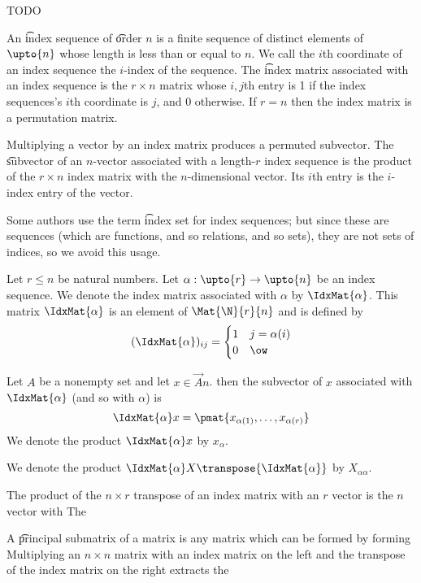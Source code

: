 

TODO


An \t{index sequence} of \t{order} $n$ is a finite sequence of distinct elements of $\upto{n}$ whose length is less than or equal to $n$.
We call the $i$th coordinate of an index sequence the \t{$i$-index} of the sequence.
The \t{index matrix} associated with an index sequence is the $r \times n$ matrix whose $i,j$th entry is 1 if the index sequences's $i$th coordinate is $j$, and $0$ otherwise.
If $r = n$ then the index matrix is a permutation matrix.

Multiplying a vector by an index matrix produces a permuted subvector.
The \t{subvector} of an $n$-vector {associated with} a length-$r$ index sequence is the product of the $r \times n$ index matrix with the $n$-dimensional vector.
Its $i$th entry is the $i$-index entry of the vector.

Some authors use the term \t{index set} for index sequences; but since these are sequences (which are functions, and so relations, and so sets), they are not sets of indices, so we avoid this usage.


Let $r \leq n$ be natural numbers.
Let $\alpha: \upto{r} \to \upto{n}$ be an index sequence.
We denote the index matrix associated with $\alpha$ by $\IdxMat{\alpha}$.
This matrix $\IdxMat{\alpha}$ is an element of $\Mat{\N}{r}{n}$ and is defined by
$$
    (\IdxMat{\alpha})_{ij} = \begin{cases}
    1 & j = \alpha(i) \\
    0 & \ow
  \end{cases}
$$

Let $A$ be a nonempty set and let $x \in \Vec{A}{n}$.
then the subvector of $x$ associated with $\IdxMat{\alpha}$ (and so with $\alpha$) is
$$
  \IdxMat{\alpha}x = \pmat{x_{\alpha(1)}, \dots, x_{\alpha(r)}}
$$
We denote the product $\IdxMat{\alpha}x$ by $x_{\alpha}$.

We denote the product $\IdxMat{\alpha}X\transpose{\IdxMat{\alpha}}$ by $X_{\alpha\alpha}$.



The product of the $n \times r$ transpose of an index  matrix with an $r$ vector is the $n$ vector with
The

A \t{principal submatrix} of a matrix is any matrix which can be formed by forming Multiplying an $n \times n$ matrix with an index matrix on the left and the transpose of the index matrix on the right extracts the

